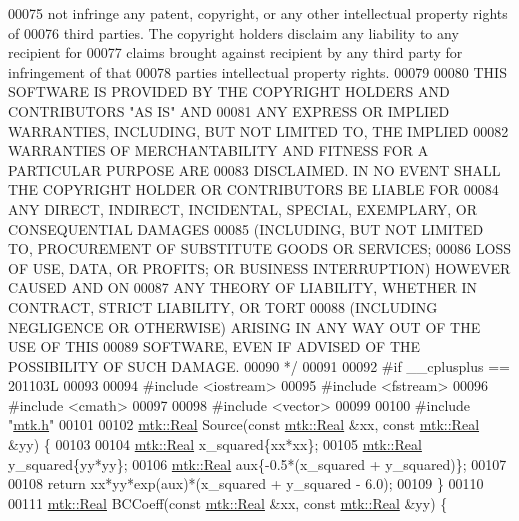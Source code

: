 \begin{DoxyCode}
00075 \textcolor{comment}{not infringe any patent, copyright, or any other intellectual property rights of}
00076 \textcolor{comment}{third parties. The copyright holders disclaim any liability to any recipient for}
00077 \textcolor{comment}{claims brought against recipient by any third party for infringement of that}
00078 \textcolor{comment}{parties intellectual property rights.}
00079 \textcolor{comment}{}
00080 \textcolor{comment}{THIS SOFTWARE IS PROVIDED BY THE COPYRIGHT HOLDERS AND CONTRIBUTORS "AS IS" AND}
00081 \textcolor{comment}{ANY EXPRESS OR IMPLIED WARRANTIES, INCLUDING, BUT NOT LIMITED TO, THE IMPLIED}
00082 \textcolor{comment}{WARRANTIES OF MERCHANTABILITY AND FITNESS FOR A PARTICULAR PURPOSE ARE}
00083 \textcolor{comment}{DISCLAIMED. IN NO EVENT SHALL THE COPYRIGHT HOLDER OR CONTRIBUTORS BE LIABLE FOR}
00084 \textcolor{comment}{ANY DIRECT, INDIRECT, INCIDENTAL, SPECIAL, EXEMPLARY, OR CONSEQUENTIAL DAMAGES}
00085 \textcolor{comment}{(INCLUDING, BUT NOT LIMITED TO, PROCUREMENT OF SUBSTITUTE GOODS OR SERVICES;}
00086 \textcolor{comment}{LOSS OF USE, DATA, OR PROFITS; OR BUSINESS INTERRUPTION) HOWEVER CAUSED AND ON}
00087 \textcolor{comment}{ANY THEORY OF LIABILITY, WHETHER IN CONTRACT, STRICT LIABILITY, OR TORT}
00088 \textcolor{comment}{(INCLUDING NEGLIGENCE OR OTHERWISE) ARISING IN ANY WAY OUT OF THE USE OF THIS}
00089 \textcolor{comment}{SOFTWARE, EVEN IF ADVISED OF THE POSSIBILITY OF SUCH DAMAGE.}
00090 \textcolor{comment}{*/}
00091 
00092 \textcolor{preprocessor}{#if \_\_cplusplus == 201103L}
00093 
00094 \textcolor{preprocessor}{#include <iostream>}
00095 \textcolor{preprocessor}{#include <fstream>}
00096 \textcolor{preprocessor}{#include <cmath>}
00097 
00098 \textcolor{preprocessor}{#include <vector>}
00099 
00100 \textcolor{preprocessor}{#include "\hyperlink{mtk_8h}{mtk.h}"}
00101 
00102 \hyperlink{group__c01-roots_gac080bbbf5cbb5502c9f00405f894857d}{mtk::Real} Source(\textcolor{keyword}{const} \hyperlink{group__c01-roots_gac080bbbf5cbb5502c9f00405f894857d}{mtk::Real} &xx, \textcolor{keyword}{const} \hyperlink{group__c01-roots_gac080bbbf5cbb5502c9f00405f894857d}{mtk::Real} &yy) \{
00103 
00104   \hyperlink{group__c01-roots_gac080bbbf5cbb5502c9f00405f894857d}{mtk::Real} x\_squared\{xx*xx\};
00105   \hyperlink{group__c01-roots_gac080bbbf5cbb5502c9f00405f894857d}{mtk::Real} y\_squared\{yy*yy\};
00106   \hyperlink{group__c01-roots_gac080bbbf5cbb5502c9f00405f894857d}{mtk::Real} aux\{-0.5*(x\_squared + y\_squared)\};
00107 
00108   \textcolor{keywordflow}{return} xx*yy*exp(aux)*(x\_squared + y\_squared - 6.0);
00109 \}
00110 
00111 \hyperlink{group__c01-roots_gac080bbbf5cbb5502c9f00405f894857d}{mtk::Real} BCCoeff(\textcolor{keyword}{const} \hyperlink{group__c01-roots_gac080bbbf5cbb5502c9f00405f894857d}{mtk::Real} &xx, \textcolor{keyword}{const} \hyperlink{group__c01-roots_gac080bbbf5cbb5502c9f00405f894857d}{mtk::Real} &yy) \{

\end{DoxyCode}

